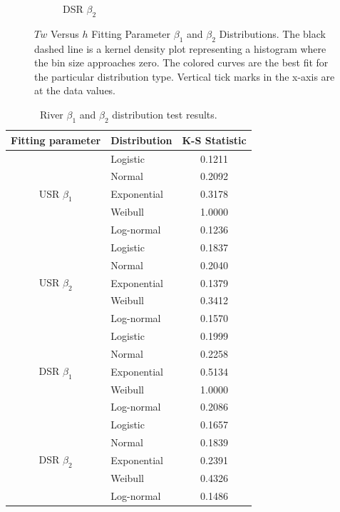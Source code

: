 \begin{linenumbers}
\begin{figure}[htbp]
\begin{subfigure}{0.5\textwidth}
	\caption{DSR $\beta_2$}
	\label{sub b2}
\end{subfigure}
\caption[$Tw$ Versus $h$ Fitting Parameter $\beta_1$ and $\beta_2$ Distributions.]{$Tw$ Versus $h$ Fitting Parameter $\beta_1$ and $\beta_2$ Distributions.  The black dashed line is a kernel density plot representing a histogram where the bin size approaches zero.  The colored curves are the best fit for the particular distribution type.  Vertical tick marks in the x-axis are at the data values.}
\label{fig:B1B2}
\end{figure}

\begin{table}[htbp]
	\centering
	\caption[River $\beta_1$ and $\beta_2$ distribution test results.]{River $\beta_1$ and $\beta_2$ distribution test results.}
	\label{tab:B1B2 distribution results}
	\begin{tabular}{clc}
		\toprule
	Fitting parameter &Distribution & K-S Statistic\\
		\midrule
		\midrule
	\multirow{5}{*}{USR $\beta_1$} & Logistic & 0.1211\\
	& Normal & 		0.2092\\
	& Exponential & 0.3178\\
	& Weibull & 	1.0000\\
	& Log-normal & 	0.1236\\
		\midrule
	\multirow{5}{*}{USR $\beta_2$} & Logistic & 0.1837\\
	& Normal & 		0.2040\\
	& Exponential & 0.1379\\
	& Weibull & 	0.3412\\
	& Log-normal & 	0.1570\\
		\midrule
	\multirow{5}{*}{DSR $\beta_1$} & Logistic & 0.1999\\
	& Normal & 		0.2258\\
	& Exponential & 0.5134\\
	& Weibull & 	1.0000\\
	& Log-normal & 	0.2086\\
		\midrule
	\multirow{5}{*}{DSR $\beta_2$} & Logistic & 0.1657\\
	& Normal & 		0.1839\\
	& Exponential & 0.2391\\
	& Weibull & 	0.4326\\
	& Log-normal & 	0.1486\\
		\bottomrule
	\end{tabular}
\end{table}


\end{linenumbers}
